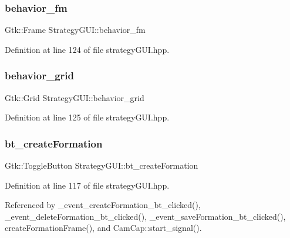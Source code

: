 \subsubsection{\texorpdfstring{behavior\+\_\+fm}{behavior\_fm}}
{\footnotesize\ttfamily Gtk\+::\+Frame Strategy\+G\+U\+I\+::behavior\+\_\+fm}



Definition at line 124 of file strategy\+G\+U\+I.\+hpp.

\mbox{\label{class_strategy_g_u_i_a705ef10226625c54803a2d47424abd32}} 
\subsubsection{\texorpdfstring{behavior\+\_\+grid}{behavior\_grid}}
{\footnotesize\ttfamily Gtk\+::\+Grid Strategy\+G\+U\+I\+::behavior\+\_\+grid}



Definition at line 125 of file strategy\+G\+U\+I.\+hpp.

\mbox{\label{class_strategy_g_u_i_ab6edc11fb98709c98ad1815998aa937a}} 
\subsubsection{\texorpdfstring{bt\+\_\+create\+Formation}{bt\_createFormation}}
{\footnotesize\ttfamily Gtk\+::\+Toggle\+Button Strategy\+G\+U\+I\+::bt\+\_\+create\+Formation}



Definition at line 117 of file strategy\+G\+U\+I.\+hpp.



Referenced by \+\_\+event\+\_\+create\+Formation\+\_\+bt\+\_\+clicked(), \+\_\+event\+\_\+delete\+Formation\+\_\+bt\+\_\+clicked(), \+\_\+event\+\_\+save\+Formation\+\_\+bt\+\_\+clicked(), create\+Formation\+Frame(), and Cam\+Cap\+::start\+\_\+signal().

\mbox{\label{class_strategy_g_u_i_acce16be9100c9d09a3a9ca2087b8370b}} 
